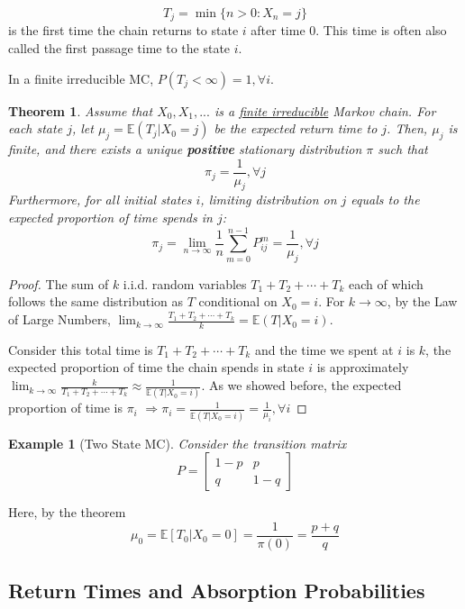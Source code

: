 \documentclass[11pt,a4paper]{article}
\newtheorem{theorem}{Theorem}
\newtheorem{example}{Example}
\begin{document}
$$T_j=\min\{n>0 : X_n = j\}$$ is the first time the chain returns to state $i$ after time $0$. This time is often also called the first passage time to the state $i$.

In a finite irreducible MC, $P(T_j<\infty)=1,\forall i$.
\begin{theorem}
    Assume that $X_0, X_1,...$ is a \underline{finite irreducible} Markov chain. For each state $j$, let $\mu_j = \mathbb{E}(T_j|X_0 = j)$ be the expected return time to $j$. Then, $\mu_j$ is finite, and there exists a unique \textbf{positive} stationary distribution $\pi$ such that $$\pi_j=\frac{1}{\mu_j},\forall j$$
    Furthermore, for all initial states $i$, limiting distribution on $j$ equals to the expected proportion of time spends in $j$: $$\pi_j=\lim_{n \rightarrow \infty}\frac{1}{n}\sum_{m=0}^{n-1}P_{ij}^m=\frac{1}{\mu_j},\forall j$$
\end{theorem}

\begin{proof}
    The sum of $k$ i.i.d. random variables $T_1+T_2+\cdots+T_k$ each of which follows the same distribution as $T$ conditional on $X_0=i$. For $k \rightarrow \infty$, by the Law of Large Numbers, $\lim_{k \rightarrow \infty}\frac{T_1+T_2+\cdots+T_k}{k} = \mathbb{E}(T|X_0=i)$.

    Consider this total time is $T_1+T_2+\cdots+T_k$ and the time we spent at $i$ is $k$, the expected proportion of time the chain spends in state $i$ is approximately $\lim_{k \rightarrow \infty}\frac{k}{T_1+T_2+\cdots+T_k}\approx \frac{1}{\mathbb{E}(T|X_0=i)}$. As we showed before, the expected proportion of time is $\pi_i$ $\Rightarrow \pi_i=\frac{1}{\mathbb{E}(T|X_0=i)}=\frac{1}{\mu_i},\forall i$
\end{proof}

\begin{example}[Two State MC]
    Consider the transition matrix $$P=\begin{bmatrix}
        1-p&p\\
        q&1-q
    \end{bmatrix}$$
\end{example}
Here, by the theorem $$\mu_0=\mathbb{E}[T_0|X_0=0]=\frac{1}{\pi(0)}=\frac{p+q}{q}$$

\subsection{Return Times and Absorption Probabilities}
\end{document}
